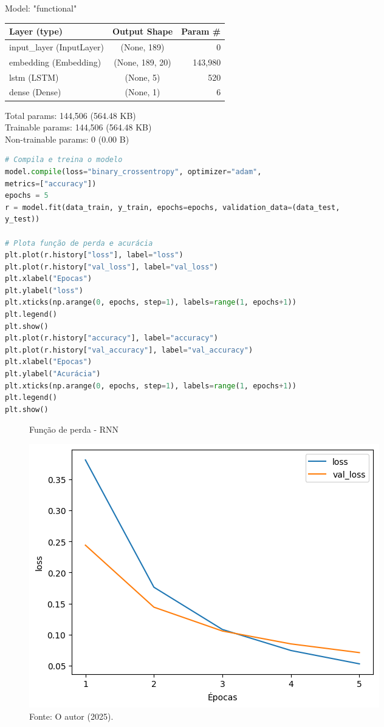 \begin{tcolorbox}[myoutputstyle]
Model: "functional"
\begin{table}[H]
\begin{tabular}{|l|c|r|}
\hline
\textbf{Layer (type)} & \textbf{Output Shape} & \textbf{Param \#} \\ \hline
input\_layer (InputLayer) & (None, 189) & 0 \\ \hline
embedding (Embedding) & (None, 189, 20) & 143,980 \\ \hline
lstm (LSTM) & (None, 5) & 520 \\ \hline
dense (Dense) & (None, 1) & 6 \\ \hline
\end{tabular}
\end{table}
 Total params: 144,506 (564.48 KB)\\
 Trainable params: 144,506 (564.48 KB)\\
 Non-trainable params: 0 (0.00 B)
\end{tcolorbox}

\begin{lstlisting}[language=Python, style=input]
# Compila e treina o modelo
model.compile(loss="binary_crossentropy", optimizer="adam",
metrics=["accuracy"])
epochs = 5
r = model.fit(data_train, y_train, epochs=epochs, validation_data=(data_test,
y_test))

# Plota função de perda e acurácia
plt.plot(r.history["loss"], label="loss")
plt.plot(r.history["val_loss"], label="val_loss")
plt.xlabel("Epocas")
plt.ylabel("loss")
plt.xticks(np.arange(0, epochs, step=1), labels=range(1, epochs+1))
plt.legend()
plt.show()
plt.plot(r.history["accuracy"], label="accuracy")
plt.plot(r.history["val_accuracy"], label="val_accuracy")
plt.xlabel("Epocas")
plt.ylabel("Acurácia")
plt.xticks(np.arange(0, epochs, step=1), labels=range(1, epochs+1))
plt.legend()
plt.show()
\end{lstlisting}


\begin{figure}[H]
\centering
\caption{Função de perda - RNN}
\includegraphics[width=.8\linewidth]{apendices/fig/9_IAA009_5.png}
\caption*{Fonte: O autor (2025).}
\end{figure}

